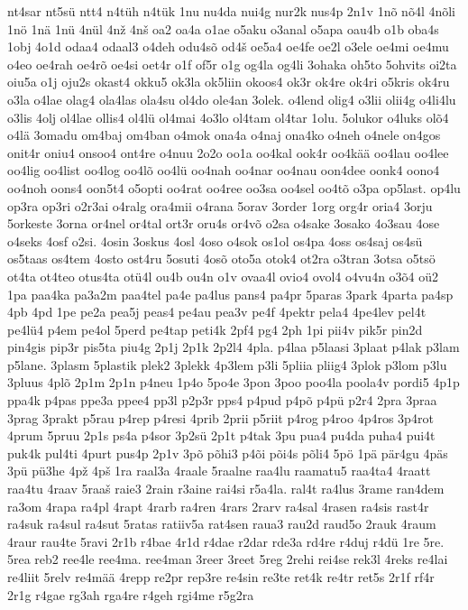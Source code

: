 {nt4sar
nt5sü
ntt4
n4tüh
n4tük
1nu
nu4da
nui4g
nur2k
nus4p
2n1v
1nõ
nõ4l
4nõli
1nö
1nä
1nü
4nül
4nž
4nš
oa2
oa4a
o1ae
o5aku
o3anal
o5apa
oau4b
o1b
oba4s
1obj
4o1d
odaa4
odaal3
o4deh
odu4sõ
od4š
oe5a4
oe4fe
oe2l
o3ele
oe4mi
oe4mu
o4eo
oe4rah
oe4rõ
oe4si
oet4r
o1f
of5r
o1g
og4la
og4li
3ohaka
oh5to
5ohvits
oi2ta
oiu5a
o1j
oju2s
okast4
okku5
ok3la
ok5liin
okoos4
ok3r
ok4re
ok4ri
o5kris
ok4ru
o3la
o4lae
olag4
ola4las
ola4su
ol4do
ole4an
3olek.
o4lend
olig4
o3lii
olii4g
o4li4lu
o3lis
4olj
ol4lae
ollis4
ol4lü
ol4mai
4o3lo
ol4tam
ol4tar
1olu.
5olukor
o4luks
olõ4
o4lä
3omadu
om4baj
om4ban
o4mok
ona4a
o4naj
ona4ko
o4neh
o4nele
on4gos
onit4r
oniu4
onsoo4
ont4re
o4nuu
2o2o
oo1a
oo4kal
ook4r
oo4kää
oo4lau
oo4lee
oo4lig
oo4list
oo4log
oo4lõ
oo4lü
oo4nah
oo4nar
oo4nau
oon4dee
oonk4
oono4
oo4noh
oons4
oon5t4
o5opti
oo4rat
oo4ree
oo3sa
oo4sel
oo4tõ
o3pa
op5last.
op4lu
op3ra
op3ri
o2r3ai
o4ralg
ora4mii
o4rana
5orav
3order
1org
org4r
oria4
3orju
5orkeste
3orna
or4nel
or4tal
ort3r
oru4s
or4võ
o2sa
o4sake
3osako
4o3sau
4ose
o4seks
4osf
o2si.
4osin
3oskus
4osl
4oso
o4sok
os1ol
os4pa
4oss
os4saj
os4sü
os5taas
os4tem
4osto
ost4ru
5osuti
4osõ
oto5a
otok4
ot2ra
o3tran
3otsa
o5tsö
ot4ta
ot4teo
otus4ta
otü4l
ou4b
ou4n
o1v
ovaa4l
ovio4
ovol4
o4vu4n
o3õ4
oü2
1pa
paa4ka
pa3a2m
paa4tel
pa4e
pa4lus
pans4
pa4pr
5paras
3park
4parta
pa4sp
4pb
4pd
1pe
pe2a
pea5j
peas4
pe4au
pea3v
pe4f
4pektr
pela4
4pe4lev
pel4t
pe4lü4
p4em
pe4ol
5perd
pe4tap
peti4k
2pf4
pg4
2ph
1pi
pii4v
pik5r
pin2d
pin4gis
pip3r
pis5ta
piu4g
2p1j
2p1k
2p2l4
4pla.
p4laa
p5laasi
3plaat
p4lak
p3lam
p5lane.
3plasm
5plastik
plek2
3plekk
4p3lem
p3li
5pliia
pliig4
3plok
p3lom
p3lu
3pluus
4plõ
2p1m
2p1n
p4neu
1p4o
5po4e
3pon
3poo
poo4la
poola4v
pordi5
4p1p
ppa4k
p4pas
ppe3a
ppee4
pp3l
p2p3r
pps4
p4pud
p4põ
p4pü
p2r4
2pra
3praa
3prag
3prakt
p5rau
p4rep
p4resi
4prib
2prii
p5riit
p4rog
p4roo
4p4ros
3p4rot
4prum
5pruu
2p1s
ps4a
p4sor
3p2sü
2p1t
p4tak
3pu
pua4
pu4da
puha4
pui4t
puk4k
pul4ti
4purt
pus4p
2p1v
3põ
põhi3
p4õi
põi4s
põli4
5pö
1pä
pär4gu
4päs
3pü
pü3he
4pž
4pš
1ra
raal3a
4raale
5raalne
raa4lu
raamatu5
raa4ta4
4raatt
raa4tu
4raav
5raaš
raie3
2rain
r3aine
rai4si
r5a4la.
ral4t
ra4lus
3rame
ran4dem
ra3om
4rapa
ra4pl
4rapt
4rarb
ra4ren
4rars
2rarv
ra4sal
4rasen
ra4sis
rast4r
ra4suk
ra4sul
ra4sut
5ratas
ratiiv5a
rat4sen
raua3
rau2d
raud5o
2rauk
4raum
4raur
rau4te
5ravi
2r1b
r4bae
4r1d
r4dae
r2dar
rde3a
rd4re
r4duj
r4dü
1re
5re.
5rea
reb2
ree4le
ree4ma.
ree4man
3reer
3reet
5reg
2rehi
rei4se
rek3l
4reks
re4lai
re4liit
5relv
re4mää
4repp
re2pr
rep3re
re4sin
re3te
ret4k
re4tr
ret5s
2r1f
rf4r
2r1g
r4gae
rg3ah
rga4re
r4geh
rgi4me
r5g2ra
}
